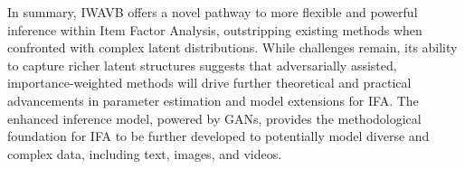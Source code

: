\documentclass[a4paper,12pt]{article}
\theoremstyle{plain} %
\theoremstyle{remark} %
\theoremstyle{definition} %
\begin{document}
In summary, IWAVB offers a novel pathway to more flexible and powerful inference within Item Factor Analysis, outstripping existing methods when confronted with complex latent distributions. While challenges remain, its ability to capture richer latent structures suggests that adversarially assisted, importance-weighted methods will drive further theoretical and practical advancements in parameter estimation and model extensions for IFA. The enhanced inference model, powered by GANs, provides the methodological foundation for IFA to be further developed to potentially model diverse and complex data, including text, images, and videos.


\end{document}
